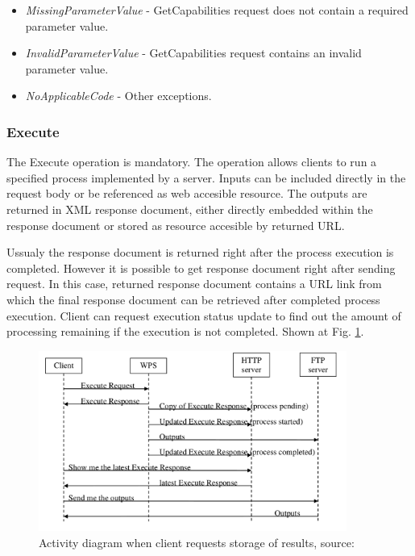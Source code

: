 \documentclass[12pt,a4paper]{article}
\begin{document}
\begin{itemize}
\item\textit{MissingParameterValue} - GetCapabilities request does not contain a required parameter value.
\item\textit{InvalidParameterValue} - GetCapabilities request contains an invalid parameter value.
\item\textit{NoApplicableCode} - Other exceptions.
\end{itemize}

\bigskip
\subsubsection{Execute}
The Execute operation is mandatory. The operation allows clients to run a specified process implemented by a server.
Inputs can be included directly in the request body or be referenced as web accesible resource. The outputs are returned
in XML response document, either directly embedded within the response document or stored as resource accesible by
returned URL.

Ussualy the response document is returned right after the process execution is completed. However it is possible to get
response document right after sending request. In this case, returned response document contains a URL link from which the
final response document can be retrieved after completed process execution. Client can request execution status update to
find out the amount of processing remaining if the execution is not completed. Shown at Fig. \ref{fig:WPS_activity}.

\begin{figure}[h!]
\centering
\includegraphics[width=0.9\textwidth]{img/WPS_activity}
\caption{Activity diagram when client requests storage of results, source: \cite{WPS_standart_1.0}}
\label{fig:WPS_activity}
\end{figure}
\end{document}
